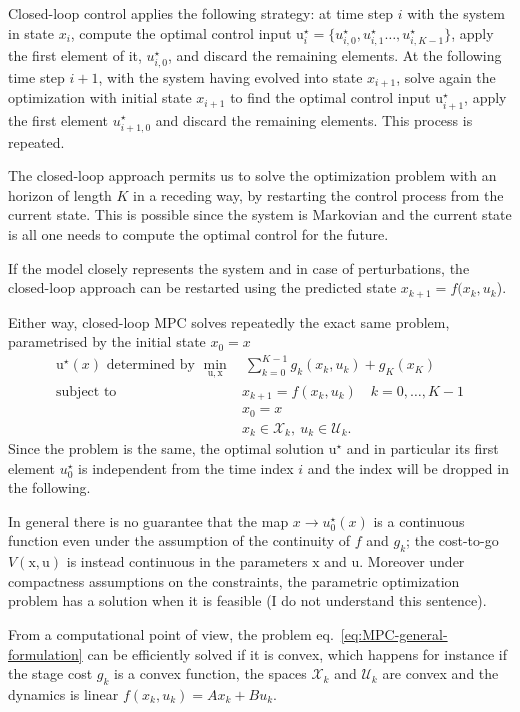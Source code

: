\documentclass[11pt]{report}
\newcommand{\bs}[1]{\boldsymbol{#1}}
\newcommand{\bsu}{\bs{\mathrm{u}}}
\newcommand{\bsx}{\bs{\mathrm{x}}}
\begin{document}
Closed-loop control applies the following strategy: at time step $i$ with the system in state $x_i$, compute the optimal control input $\bsu_i^\star=\{u_{i,0}^\star,u_{i,1}^\star\ldots,u_{i,K-1}^\star\}$, apply the first element of it, $u_{i,0}^\star$, and discard the remaining elements. At the following time step $i+1$, with the system having evolved into state $x_{i+1}$, solve again the optimization with initial state $x_{i+1}$ to find the optimal control input $\bsu_{i+1}^\star$, apply the first element $u_{i+1,0}^\star$ and discard the remaining elements. This process is repeated.

The closed-loop approach permits us to solve the optimization problem with an horizon of length $K$ in a receding way, by restarting the control process from the current state. This is possible since the system is Markovian and the current state is all one needs to compute the optimal control for the future.

If the model closely represents the system and in case of perturbations, the closed-loop approach can be restarted using the predicted state $x_{k+1} = f(x_k,u_k$).

Either way, closed-loop MPC solves repeatedly the exact same problem, parametrised by the initial state $x_0=x$
\begin{align*}
  \bsu^\star(x) \text{ determined by } \min_{\bsu, \bsx} &\ \sum_{k=0}^{K-1}g_k(x_k, u_k) + g_K(x_K)\\
  \text{subject to } & x_{k+1} = f(x_k,u_k)\quad k=0,\ldots,K-1 \\
                                                         & x_0 = x \\
                                                         & x_k \in \mathcal{X}_k,\ u_k \in \mathcal{U}_k.
\end{align*}
Since the problem is the same, the optimal solution $\bsu^\star$ and in particular its first element $u_0^\star$ is independent from the time index $i$ and the index will be dropped in the following.

In general there is no guarantee that the map $x \rightarrow u_0^\star(x)$ is a continuous function even under the assumption of the continuity of $f$ and $g_k$; the cost-to-go $V(\bsx,\bsu)$ is instead continuous in the parameters $\bsx$ and $\bsu$. Moreover under compactness assumptions on the constraints, the parametric optimization problem has a solution when it is feasible (I do not understand this sentence).

From a computational point of view, the problem eq.~\eqref{eq:MPC-general-formulation} can be efficiently solved if it is convex, which happens for instance if the stage cost $g_k$ is a convex function, the spaces $\mathcal{X}_k$ and $\mathcal{U}_k$ are convex and the dynamics is linear $f(x_k,u_k)=Ax_k+Bu_k$.
\end{document}
